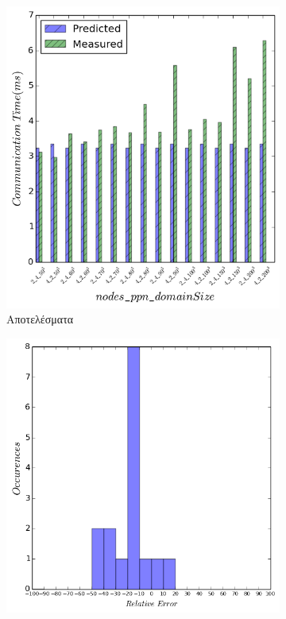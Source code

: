 \begin{figure}[H]
    \centering
    \captionsetup{justification=centering,margin=0cm,font=footnotesize}
    \begin{subfigure}[b]{0.47\textwidth}
        \includegraphics[width=\textwidth]{./images/coll_NUMA/res.png}
        \caption{Αποτελέσματα}
    \end{subfigure}
    \quad %
    \begin{subfigure}[b]{0.47\textwidth}
        \includegraphics[width=\textwidth]{./images/coll_NUMA/Err_Dist.png}

\end{subfigure}
\end{figure}
